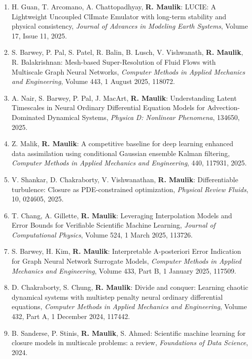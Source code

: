 \documentclass[letterpaper]{article}
\begin{document}
\begin{enumerate}
\item H. Guan, T. Arcomano, A. Chattopadhyay, \textbf{R. Maulik}: LUCIE: A Lightweight Uncoupled ClImate Emulator with long-term stability and physical consistency, {\it Journal of Advances in Modeling Earth Systems}, Volume 17, Issue 11, 2025.

\item S. Barwey, P. Pal, S. Patel, R. Balin, B. Lusch, V. Vishwanath, \textbf{R. Maulik}, R. Balakrishnan: Mesh-based Super-Resolution of Fluid Flows with Multiscale Graph Neural Networks, {\it Computer Methods in Applied Mechanics and Engineering}, Volume 443, 1 August 2025, 118072.

\item A. Nair, S. Barwey, P. Pal, J. MacArt, \textbf{R. Maulik}: Understanding Latent Timescales in Neural Ordinary Differential Equation Models for Advection-Dominated Dynamical Systems, {\it Physica D: Nonlinear Phenomena}, 134650, 2025.

\item Z. Malik, \textbf{R. Maulik}: A competitive baseline for deep learning enhanced data assimilation using conditional Gaussian ensemble Kalman filtering, {\it Computer Methods in Applied Mechanics and Engineering}, 440, 117931, 2025.

\item V. Shankar, D. Chakraborty, V. Vishwanathan, \textbf{R. Maulik}: Differentiable turbulence: Closure as PDE-constrained optimization, {\it Physical Review Fluids}, 10, 024605, 2025.

\item T. Chang, A. Gillette, \textbf{R. Maulik}: Leveraging Interpolation Models and Error Bounds for Verifiable Scientific Machine Learning, {\it Journal of Computational Physics}, Volume 524, 1 March 2025, 113726.

\item S. Barwey, H. Kim, \textbf{R. Maulik}: Interpretable A-posteriori Error Indication for Graph Neural Network Surrogate Models, {\it Computer Methods in Applied Mechanics and Engineering}, Volume 433, Part B, 1 January 2025, 117509.

\item D. Chakraborty, S. Chung, \textbf{R. Maulik}: Divide and conquer: Learning chaotic dynamical systems with multistep penalty neural ordinary differential equations, {\it Computer Methods in Applied Mechanics and Engineering}, Volume 432, Part A, 1 December 2024, 117442.

\item B. Sanderse, P. Stinis, \textbf{R. Maulik}, S. Ahmed: Scientific machine learning for closure models in multiscale problems: a review, {\it Foundations of Data Science}, 2024.


\end{enumerate}
\end{document}
